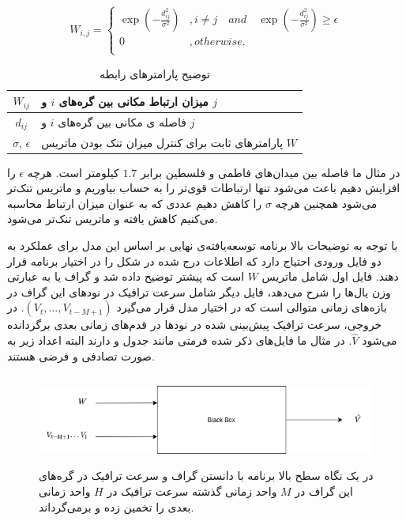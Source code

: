 \begin{equation}
  W_{i,j} = \left\{
    \begin{array}{ll}
      \exp(-\frac{d^{2}_{ij}}{\sigma^{2}}) & , i \neq j \quad and \quad \exp(-\frac{d^{2}_{ij}}{\sigma^{2}}) \geq \epsilon \\
      0 & , otherwise. \\
    \end{array}\right.
  \label{eq:distance}
\end{equation}

\begin{table}[h]
  \centering
  \caption{توضیح پارامترهای رابطه }
  \begin{tabular}{|c|p{}|}
    \hline
    $W_{ij}$ & میزان ارتباط مکانی بین گره‌های $i$ و $j$ \\
    \hline
    $d_{ij}$ & فاصله ی مکانی بین گره‌های $i$ و $j$ \\
    \hline
    $\sigma$, $\epsilon$ & پارامترهای ثابت برای کنترل میزان تنک{Sparsity} بودن ماتریس $W$ \\
    \hline
  \end{tabular}
  \label{tbl:distance}
\end{table}

در مثال ما فاصله بین میدان‌های فاطمی و فلسطین برابر $1.7$ کیلومتر است.
هرچه $\epsilon$ را افزایش دهیم باعث می‌شود تنها ارتباطات قوی‌تر را به حساب بیاوریم و ماتریس تنک‌تر می‌شود
همچنین هرچه $\sigma$ را کاهش دهیم عددی که به عنوان میزان ارتباط محاسبه می‌کنیم کاهش یافته و ماتریس تنک‌تر می‌شود.

با توجه به توضیحات بالا برنامه توسعه‌یافته‌ی نهایی بر اساس این مدل برای عملکرد به دو فایل ورودی احتیاج دارد که اطلاعات درج شده در شکل  را در اختیار برنامه قرار دهند.
فایل اول شامل ماتریس $W$ است که پیشتر توضیح داده شد و گراف یا به عبارتی وزن یال‌ها را شرح می‌دهد،
فایل دیگر شامل سرعت ترافیک در نودهای این گراف در بازه‌های زمانی متوالی است که در اختیار مدل قرار می‌گیرد $(V_{t}, \ldots, V_{t-M+1})$.
در خروجی، سرعت ترافیک پیش‌بینی شده در نودها در قدم‌های زمانی بعدی برگردانده می‌شود $\hat{V}$.
در مثال ما فایل‌های ذکر شده فرمتی مانند جدول  و  دارند البته اعداد زیر به صورت تصادفی و فرضی هستند.

\begin{figure}
  \includegraphics[height=3cm]{./images/blackbox.png}
  \centering
  \caption{
در یک نگاه سطح بالا برنامه با دانستن گراف و سرعت ترافیک در گره‌های این گراف در $M$ واحد زمانی گذشته سرعت ترافیک در $H$ واحد زمانی بعدی را تخمین زده و برمی‌گرداند.
  }
  \label{fig:blackbox}
\end{figure}

